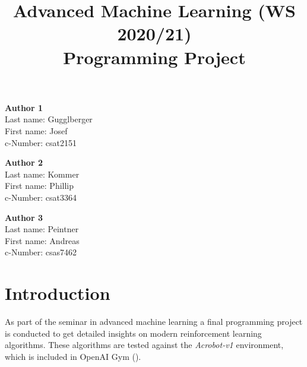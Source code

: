 \documentclass[11pt,a4paper]{article}
\title{\textbf{Advanced Machine Learning (WS 2020/21) \\Programming Project}}
\date{}
\begin{document}
\maketitle
\vspace{-3em}

\begin{tcolorbox}[
size=tight,
colback=white,
boxrule=0.2mm,
left=3mm,right=3mm, top=3mm, bottom=1mm
]
{\begin{multicols}{3}

\textbf{Author 1}       \\
Last name: Gugglberger               \\  %
First name: Josef            \\  %
c-Number: csat2151               \\  %

\columnbreak

\textbf{Author 2}       \\
Last name: Kommer             \\  %
First name: Phillip             \\  %
c-Number: csat3364             \\  %

\columnbreak

\textbf{Author 3}       \\
Last name: Peintner               \\  %
First name: Andreas             \\  %
c-Number: csas7462               \\  %

\end{multicols}}
\end{tcolorbox}


\section{Introduction}
\label{sec:intro}

As part of the seminar in advanced machine learning a final programming project is conducted to get detailed insights on modern reinforcement learning algorithms. These algorithms are tested against the \textit{Acrobot-v1} environment, which is included in OpenAI Gym (\cite{openai-gym}). %
\end{document}
